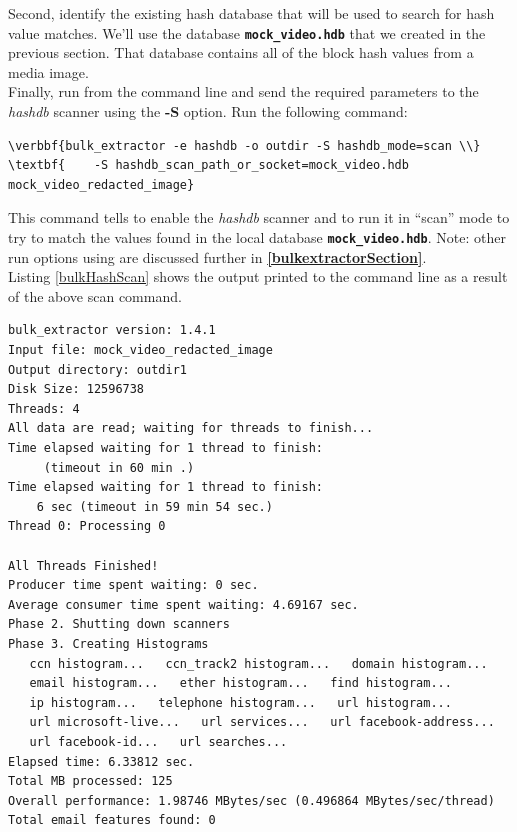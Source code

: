 \documentclass[11pt,fleqn]{article} %
\begin{document}
Second, identify the existing hash database that will be used to search for hash value matches. We'll use the database \texttt{\textbf{mock\_video.hdb}} that we created in the previous section. That database contains all of the block hash values from a media image. \\

Finally, run \bulk from the command line and send the required parameters to the \textit{hashdb} scanner using the \textbf{-S} option. Run the following command: 
\begin{Verbatim}[commandchars=\\\{\}]
\verbbf{bulk_extractor -e hashdb -o outdir -S hashdb_mode=scan \\}
\textbf{    -S hashdb_scan_path_or_socket=mock_video.hdb mock_video_redacted_image}
\end{Verbatim}
This command tells \bulk to enable the \textit{hashdb} scanner and to run it in ``scan'' mode to try to match the values found in the local database \texttt{\textbf{mock\_video.hdb}}. Note: other run options using \bulk are discussed further in \textbf{\autoref{bulkextractorSection}}.\\

Listing \ref{bulkHashScan} shows the output printed to the command line as a result of the above \bulk \hash scan command. \\

\lstset{style=customfile}
\begin{lstlisting}[float, caption=Output from \bulk \hash scan, label=bulkHashScan]
bulk_extractor version: 1.4.1
Input file: mock_video_redacted_image
Output directory: outdir1
Disk Size: 12596738
Threads: 4
All data are read; waiting for threads to finish...
Time elapsed waiting for 1 thread to finish:
     (timeout in 60 min .)
Time elapsed waiting for 1 thread to finish:
    6 sec (timeout in 59 min 54 sec.)
Thread 0: Processing 0

All Threads Finished!
Producer time spent waiting: 0 sec.
Average consumer time spent waiting: 4.69167 sec.
Phase 2. Shutting down scanners
Phase 3. Creating Histograms
   ccn histogram...   ccn_track2 histogram...   domain histogram...
   email histogram...   ether histogram...   find histogram...
   ip histogram...   telephone histogram...   url histogram...
   url microsoft-live...   url services...   url facebook-address...
   url facebook-id...   url searches...
Elapsed time: 6.33812 sec.
Total MB processed: 125
Overall performance: 1.98746 MBytes/sec (0.496864 MBytes/sec/thread)
Total email features found: 0
\end{lstlisting}
\end{document}
